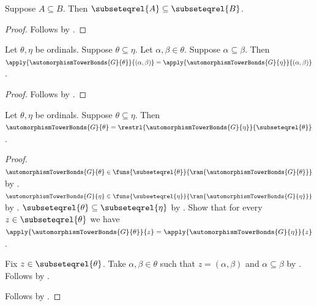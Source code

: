 \begin{proposition}\label{subseteqrel_monotone_for_tower}
    Suppose $A\subseteq B$.
    Then $\subseteqrel{A}\subseteq\subseteqrel{B}$.
\end{proposition}
\begin{proof}
    Follows by .
\end{proof}

\begin{proposition}\label{automorphism_tower_bond_prefix_value}
    Let $\theta,\eta$ be ordinals.
    Suppose $\theta\subseteq\eta$.
    Let $\alpha,\beta\in\theta$.
    Suppose $\alpha\subseteq\beta$.
    Then $\apply{\automorphismTowerBonds{G}{\theta}}{(\alpha,\beta)}=
        \apply{\automorphismTowerBonds{G}{\eta}}{(\alpha,\beta)}$.
\end{proposition}
\begin{proof}
    Follows by
        .
\end{proof}

\begin{theorem}\label{automorphism_tower_bonds_restriction}
    Let $\theta,\eta$ be ordinals.
    Suppose $\theta\subseteq\eta$.
    Then $\automorphismTowerBonds{G}{\theta}=
        \restrl{\automorphismTowerBonds{G}{\eta}}
            {\subseteqrel{\theta}}$.
\end{theorem}
\begin{proof}
    $\automorphismTowerBonds{G}{\theta}\in
        \funs{\subseteqrel{\theta}}{
            \ran{\automorphismTowerBonds{G}{\theta}}}$ by
        .
    $\automorphismTowerBonds{G}{\eta}\in
        \funs{\subseteqrel{\eta}}{
            \ran{\automorphismTowerBonds{G}{\eta}}}$ by
        .
    $\subseteqrel{\theta}\subseteq\subseteqrel{\eta}$ by
        .
    Show that for every $z\in\subseteqrel{\theta}$ we have
        $\apply{\automorphismTowerBonds{G}{\theta}}{z}=
        \apply{\automorphismTowerBonds{G}{\eta}}{z}$.
    \begin{subproof}
        Fix $z\in\subseteqrel{\theta}$.
        Take $\alpha,\beta\in\theta$ such that
            $z=(\alpha,\beta)$ and $\alpha\subseteq\beta$ by
            .
        Follows by
            .
    \end{subproof}
    Follows by .
\end{proof}

